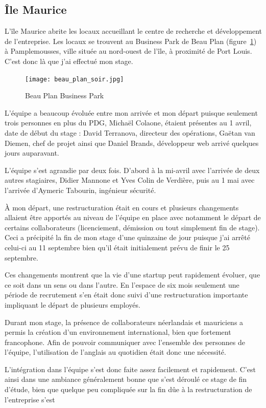 \documentclass[a4paper,10pt, twoside]{report}
\begin{document}
\begin{spacing}{1.2}
\section{Île Maurice}

L'île Maurice abrite les locaux accueillant le centre de recherche et
développement de l'entreprise. Les locaux se trouvent au Business Park de
Beau Plan (figure~\ref{beauPlan}) à Pamplemousses, ville située au
nord-ouest de l'île, à proximité de Port Louis. C'est donc là que
j'ai effectué mon stage.

\begin{figure}[h!]
  \centering
  \texttt{[image: beau\_plan\_soir.jpg]}
  \caption{\label{beauPlan} Beau Plan Business Park}
\end{figure}

L'équipe a beaucoup évoluée entre mon arrivée et mon départ puisque
seulement trois personnes en plus du PDG, Michaël Colaone, étaient
présentes au 1 avril, date de début du stage : David Terranova,
directeur des opérations, Gaëtan van Diemen, chef de projet ainsi que
Daniel Brands, développeur web arrivé quelques jours auparavant.

L'équipe s'est agrandie par deux fois. D'abord à la mi-avril avec
l'arrivée de deux autres stagiaires, Didier Mannone et
Yves Colin de Verdière, puis au 1 mai avec l'arrivée d'Aymeric
Tabourin, ingénieur sécurité.

À mon départ, une restructuration était en cours et plusieurs changements
allaient être apportés au niveau de l'équipe en place avec notamment le
départ de certains collaborateurs (licenciement, démission ou tout
simplement fin de stage). Ceci a précipité la fin de mon stage d'une
quinzaine de jour puisque j'ai arrêté celui-ci au 11 septembre bien qu'il
était initialement prévu de finir le 25 septembre.

Ces changements montrent que la vie d'une startup peut rapidement évoluer,
que ce soit dans un sens ou dans l'autre. En l'espace de six mois seulement
une période de recrutement s'en était donc suivi d'une restructuration
importante impliquant le départ de plusieurs employés.

Durant mon stage, la présence de collaborateurs
néerlandais et mauriciens a permis la création d'un environnement
international, bien que fortement francophone. Afin de pouvoir communiquer avec
l'ensemble des personnes de l'équipe, l'utilisation de l'anglais au quotidien
était donc une nécessité.

L'intégration dans l'équipe s'est donc faite assez facilement et rapidement.
C'est ainsi dans une ambiance généralement bonne que s'est
déroulé ce stage de fin d'étude, bien que quelque peu
compliquée sur la fin dûe à la restructuration de l'entreprise s'est


\end{spacing}
\end{document}
